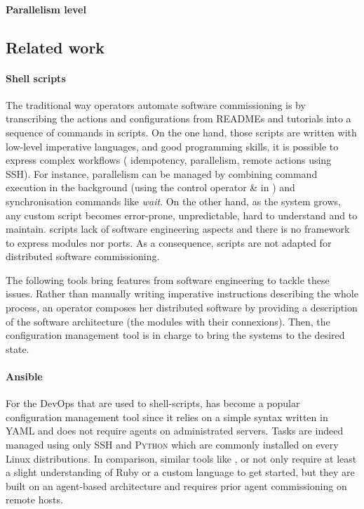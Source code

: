 \paragraph{Parallelism level}

\subsection{Related work}

\paragraph{Shell scripts}
The traditional way operators automate software commissioning is by transcribing
the actions and configurations from READMEs and tutorials into a sequence of
commands in \shell scripts.
On the one hand, those scripts are written with low-level imperative languages,
and good programming skills, it is possible to express complex workflows (\eg
idempotency, parallelism, remote actions using \textsc{SSH}).
For instance, parallelism can be managed by combining command execution in the
background (\eg using the control operator \& in \bash) and synchronisation
commands like \emph{wait}.
On the other hand, as the system grows, any custom script becomes error-prone,
unpredictable, hard to understand and to maintain.
\shell scripts lack of software engineering aspects and there is no framework to
express modules nor ports. As a consequence, \shell scripts are not adapted for
distributed software commissioning.

The following tools bring features from software engineering to tackle these
issues. Rather than manually writing imperative instructions describing the
whole process, an operator composes her distributed software by providing a
description of the software architecture (\ie the modules with their
connexions). Then, the configuration management tool is in charge to bring the
systems to the desired state.

\paragraph{Ansible}
For the DevOps that are used to shell-scripts, \ansible has become a popular
configuration management tool since it relies on a simple syntax written in YAML
and does not require agents on administrated servers. Tasks are indeed managed
using only \textsc{SSH} and \textsc{Python} which are commonly installed on
every Linux distributions.
In comparison, similar tools like \chef, \puppet or \cfengine not only require
at least a slight understanding of Ruby or a custom language to get started, but
they are built on an agent-based architecture and requires prior agent
commissioning on remote hosts.

